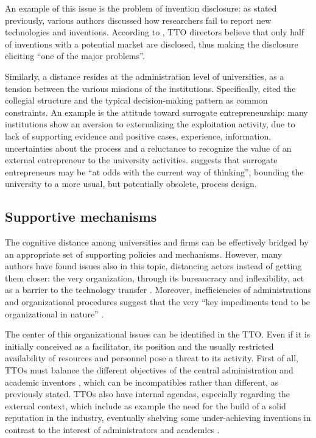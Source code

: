An example of this issue is the problem of invention disclosure: as stated previously, various authors discussed how researchers fail to report new technologies and inventions. According to \citet{Jensen2003}, TTO directors believe that only half of inventions with a potential market are disclosed, thus making the disclosure eliciting \enquote{one of the major problems}.

Similarly, a distance resides at the administration level of universities, as a tension between the various missions of the institutions. Specifically, \citet{Guerrero2014} cited the collegial structure and the typical decision-making pattern as common constraints. An example is the attitude toward surrogate entrepreneurship: many institutions show an aversion to externalizing the exploitation activity, due to lack of supporting evidence and positive cases, experience, information, uncertainties about the process and a reluctance to recognize the value of an external entrepreneur to the university activities. \citet{Franklin2001} suggests that surrogate entrepreneurs may be \enquote{at odds with the current way of thinking}, bounding the university to a more usual, but potentially obsolete, process design. 

\subsection{Supportive mechanisms}

The cognitive distance among universities and firms can be effectively bridged by an appropriate set of supporting policies and mechanisms. However, many authors have found issues also in this topic, distancing actors instead of getting them closer: the very organization, through its bureaucracy and inflexibility, act as a barrier to the technology transfer \citep{Siegel2003a}. Moreover, inefficiencies of administrations and organizational procedures \citep{Baldini2007} suggest that the very \enquote{key impediments tend to be organizational in nature} \citep{Siegel2007}. 

The center of this organizational issues can be identified in the TTO. Even if it is initially conceived as a facilitator, its position and the usually restricted availability of resources and personnel pose a threat to its activity. First of all, TTOs must balance the different objectives of the central administration and academic inventors \citep{Jensen2003}, which can be incompatibles rather than different, as previously stated. TTOs also have internal agendas, especially regarding the external context, which include as example the need for the build of a solid reputation in the industry, eventually shelving some under-achieving inventions in contrast to the interest of administrators and academics \citep{Siegel2007}. 

